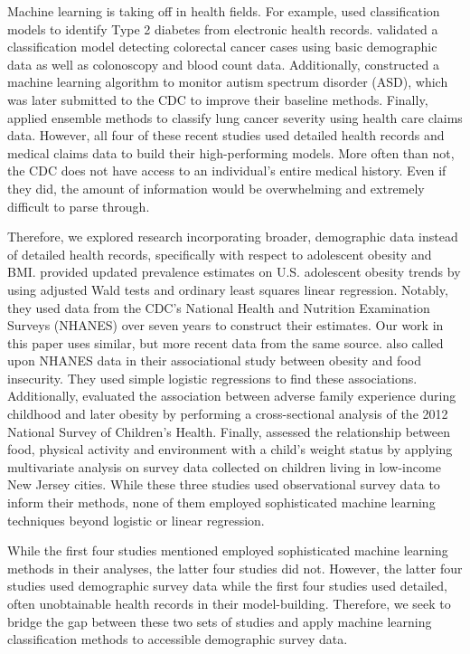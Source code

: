 \documentclass[twoside,11pt]{article}
\begin{document}
Machine learning is taking off in health fields. For example, \cite{zheng:17} used classification models to identify Type 2 diabetes from electronic health records. \cite{horn:17} validated a classification model detecting colorectal cancer cases using basic demographic data as well as colonoscopy and blood count data. Additionally, \cite{maenner:16} constructed a machine learning algorithm to monitor autism spectrum disorder (ASD), which was later submitted to the CDC to improve their baseline methods. Finally, \cite{bergquist:17} applied ensemble methods to classify lung cancer severity using health care claims data. However, all four of these recent studies used detailed health records and medical claims data to build their high-performing models. More often than not, the CDC does not have access to an individual's entire medical history. Even if they did, the amount of information would be overwhelming and extremely difficult to parse through. 

Therefore, we explored research incorporating broader, demographic data instead of detailed health records, specifically with respect to adolescent obesity and BMI. \cite{cockrell:18} provided updated prevalence estimates on U.S. adolescent obesity trends by using adjusted Wald tests and ordinary least squares linear regression. Notably, they used data from the CDC's National Health and Nutrition Examination Surveys (NHANES) over seven years to construct their estimates. Our work in this paper uses similar, but more recent data from the same source. \cite{kaur:17} also called upon NHANES data in their associational study between obesity and food insecurity. They used simple logistic regressions to find these associations. Additionally, \cite{heer:16} evaluated the association between adverse family experience during childhood and later obesity by performing a cross-sectional analysis of the 2012 National Survey of Children's Health.  Finally, \cite{ohri:13} assessed the relationship between food, physical activity and environment with a child's weight status by applying multivariate analysis on survey data collected on children living in low-income New Jersey cities. While these three studies used observational survey data to inform their methods, none of them employed sophisticated machine learning techniques beyond logistic or linear regression. 

While the first four studies mentioned employed sophisticated machine learning methods in their analyses, the latter four studies did not. However, the latter four studies used demographic survey data while the first four studies used detailed, often unobtainable health records in their model-building. Therefore, we seek to bridge the gap between these two sets of studies and apply machine learning classification methods to accessible demographic survey data. 
\end{document}

